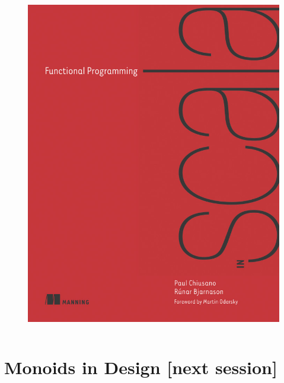 \documentclass{beamer}
\begin{document}
\begin{frame}
\begin{columns}[c]
    \begin{figure}
        \centering
        \includegraphics[width=\textwidth]{functional-programming-in-scala.png}
    \end{figure}
  \end{columns}
\end{frame}

\section{Monoids in Design \color[rgb]{0.5,0.1,0.9}[next session]}
\end{document}
